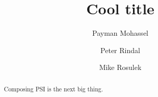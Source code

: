 \documentclass[11pt,letterpaper]{article}
\title{Cool title}
\author{Payman Mohassel \and Peter Rindal \and Mike Rosulek }
\begin{document}
\maketitle

\begin{abstract}
Composing PSI is the next big thing.
\end{abstract}


















\end{document}
